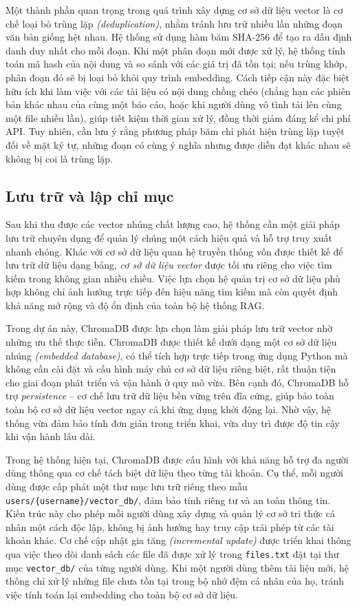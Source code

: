 Một thành phần quan trọng trong quá trình xây dựng cơ sở dữ liệu vector là cơ chế loại bỏ trùng lặp \emph{(deduplication)}, nhằm tránh lưu trữ nhiều lần những đoạn văn bản giống hệt nhau. Hệ thống sử dụng hàm băm SHA-256 để tạo ra dấu định danh duy nhất cho mỗi đoạn. Khi một phân đoạn mới được xử lý, hệ thống tính toán mã hash của nội dung và so sánh với các giá trị đã tồn tại; nếu trùng khớp, phân đoạn đó sẽ bị loại bỏ khỏi quy trình embedding. Cách tiếp cận này đặc biệt hữu ích khi làm việc với các tài liệu có nội dung chồng chéo (chẳng hạn các phiên bản khác nhau của cùng một báo cáo, hoặc khi người dùng vô tình tải lên cùng một file nhiều lần), giúp tiết kiệm thời gian xử lý, đồng thời giảm đáng kể chi phí API. Tuy nhiên, cần lưu ý rằng phương pháp băm chỉ phát hiện trùng lặp tuyệt đối về mặt ký tự, những đoạn có cùng ý nghĩa nhưng được diễn đạt khác nhau sẽ không bị coi là trùng lặp.


\subsection{Lưu trữ và lập chỉ mục}

Sau khi thu được các vector nhúng chất lượng cao, hệ thống cần một giải pháp lưu trữ chuyên dụng để quản lý chúng một cách hiệu quả và hỗ trợ truy xuất nhanh chóng. Khác với cơ sở dữ liệu quan hệ truyền thống vốn được thiết kế để lưu trữ dữ liệu dạng bảng, \emph{cơ sở dữ liệu vector} được tối ưu riêng cho việc tìm kiếm trong không gian nhiều chiều. Việc lựa chọn hệ quản trị cơ sở dữ liệu phù hợp không chỉ ảnh hưởng trực tiếp đến hiệu năng tìm kiếm mà còn quyết định khả năng mở rộng và độ ổn định của toàn bộ hệ thống RAG.

Trong dự án này, ChromaDB được lựa chọn làm giải pháp lưu trữ vector nhờ những ưu thế thực tiễn. ChromaDB được thiết kế dưới dạng một cơ sở dữ liệu nhúng \emph{(embedded database)}, có thể tích hợp trực tiếp trong ứng dụng Python mà không cần cài đặt và cấu hình máy chủ cơ sở dữ liệu riêng biệt, rất thuận tiện cho giai đoạn phát triển và vận hành ở quy mô vừa. Bên cạnh đó, ChromaDB hỗ trợ \emph{persistence} -- cơ chế lưu trữ dữ liệu bền vững trên đĩa cứng, giúp bảo toàn toàn bộ cơ sở dữ liệu vector ngay cả khi ứng dụng khởi động lại. Nhờ vậy, hệ thống vừa đảm bảo tính đơn giản trong triển khai, vừa duy trì được độ tin cậy khi vận hành lâu dài.


Trong hệ thống hiện tại, ChromaDB được cấu hình với khả năng hỗ trợ đa người dùng thông qua cơ chế tách biệt dữ liệu theo từng tài khoản. Cụ thể, mỗi người dùng được cấp phát một thư mục lưu trữ riêng theo mẫu \texttt{users/\{username\}/vector\_db/}, đảm bảo tính riêng tư và an toàn thông tin. Kiến trúc này cho phép mỗi người dùng xây dựng và quản lý cơ sở tri thức cá nhân một cách độc lập, không bị ảnh hưởng hay truy cập trái phép từ các tài khoản khác. Cơ chế cập nhật gia tăng \emph{(incremental update)} được triển khai thông qua việc theo dõi danh sách các file đã được xử lý trong \texttt{files.txt} đặt tại thư mục \texttt{vector\_db/} của từng người dùng. Khi một người dùng thêm tài liệu mới, hệ thống chỉ xử lý những file chưa tồn tại trong bộ nhớ đệm cá nhân của họ, tránh việc tính toán lại embedding cho toàn bộ cơ sở dữ liệu.

